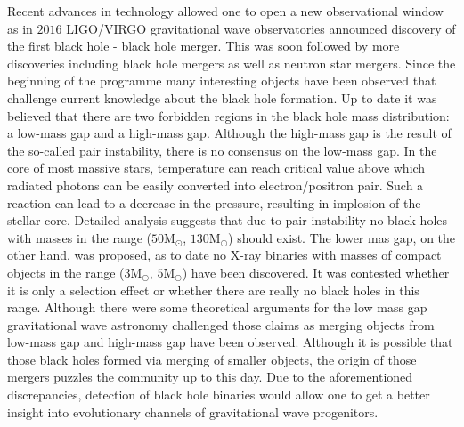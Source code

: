 \documentclass{pracalicmgr}
\begin{document}
Recent advances in technology allowed one to open a new observational window as in $2016$ LIGO/VIRGO gravitational wave observatories
announced discovery of the first black hole - black hole merger. This was soon followed by more discoveries including black hole mergers as
well as neutron star mergers. Since the beginning of the programme many interesting objects have been observed that challenge current knowledge
about the black hole formation. Up to date it was believed that there are two forbidden regions in the black hole mass distribution: a
low-mass gap and a high-mass gap. Although the high-mass gap is the result of the so-called pair instability, there is no consensus on the low-mass gap.
In the core of most massive stars, temperature can reach critical value above which radiated photons can be easily converted into electron/positron pair. Such a
reaction can lead to a decrease in the pressure, resulting in implosion of the stellar core. Detailed analysis suggests that due to pair instability 
no black holes with masses in the range ($50 \textrm{M}_{\odot}$, $130 \textrm{M}_{\odot}$) should exist.
The lower mas gap, on the other hand, was proposed, as to date no X-ray binaries with masses of compact objects in the range ($3 \textrm{M}_{\odot}$, $5 \textrm{M}_{\odot}$)
have been discovered. It was contested whether it is only a
selection effect or whether there are really no black holes in this range. Although there were some theoretical arguments for the low mass gap \citep{belczynski_missing_2012}
gravitational wave astronomy challenged those claims as merging objects from low-mass gap and high-mass gap have been observed. Although
it is possible that those black holes formed via merging of smaller objects, the origin of those mergers puzzles the community up to this day. 
Due to the aforementioned discrepancies, detection of black hole binaries would allow one to get a better insight into evolutionary channels
of gravitational wave progenitors. 
\end{document}
